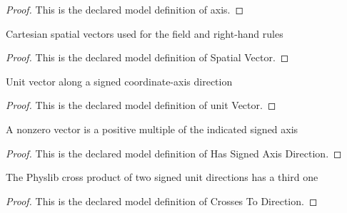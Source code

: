 \begin{proof}
  This is the declared model definition of axis.
\end{proof}
\begin{definition}
  \label{def:physics:phyx-mini-0948:phyxminiproblems-problemphyxmini0948-spatialvector}
  Cartesian spatial vectors used for the field and right-hand rules
\end{definition}
\begin{proof}
  This is the declared model definition of Spatial Vector.
\end{proof}
\begin{definition}
  \label{def:physics:phyx-mini-0948:phyxminiproblems-problemphyxmini0948-signedaxisdirection-unitvector}
  Unit vector along a signed coordinate-axis direction
\end{definition}
\begin{proof}
  This is the declared model definition of unit Vector.
\end{proof}
\begin{definition}
  \label{def:physics:phyx-mini-0948:phyxminiproblems-problemphyxmini0948-hassignedaxisdirection}
  A nonzero vector is a positive multiple of the indicated signed axis
\end{definition}
\begin{proof}
  This is the declared model definition of Has Signed Axis Direction.
\end{proof}
\begin{definition}
  \label{def:physics:phyx-mini-0948:phyxminiproblems-problemphyxmini0948-crossestodirection}
  The Physlib cross product of two signed unit directions has a third one
\end{definition}
\begin{proof}
  This is the declared model definition of Crosses To Direction.
\end{proof}
